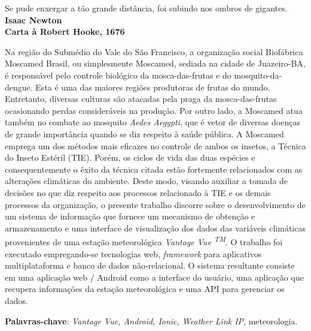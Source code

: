 \begin{epigrafe}
    \vspace*{\fill}
	\begin{flushright}
		Se pude enxergar a tão grande distância, foi subindo nos ombros de gigantes.\\
		 \vspace{\baselineskip}
		\textbf{Isaac Newton}\\
		\textbf{Carta à Robert Hooke, 1676}
	\end{flushright}
\end{epigrafe}


\setlength{\absparsep}{18pt} %
\begin{resumo}
Na região do Submédio do Vale do São Francisco, a organização social Biofábrica Moscamed Brasil, ou simplesmente Moscamed, sediada na cidade de Juazeiro-BA, é responsável pelo controle biológico da mosca-das-frutas e do mosquito-da-dengue. Esta é uma das maiores regiões produtoras de frutas do mundo. Entretanto, diversas culturas são atacadas pela praga da mosca-das-frutas ocasionando perdas consideráveis na produção. Por outro lado, a Moscamed atua também no combate ao mosquito \textit{Aedes Aegypti}, que é vetor de diversas doenças de grande importância quando se diz respeito à saúde pública. A Moscamed emprega um dos métodos mais eficazes no controle de ambos os insetos, a Técnica do Inseto Estéril (TIE). Porém, os ciclos de vida das duas espécies e consequentemente o êxito da técnica citada estão fortemente relacionados com as alterações climáticas do ambiente. Deste modo, visando auxiliar a tomada de decisões no que diz respeito aos processos relacionado à TIE e os demais processos da organização, o presente trabalho discorre sobre o desenvolvimento de um sistema de informação que fornece um mecanismo de obtenção e armazenamento e uma interface de visualização dos dados das variáveis climáticas provenientes de uma estação meteorológica \textit{Vantage Vue \textsuperscript{TM}}. O trabalho foi executado empregando-se tecnologias web, \textit{framework} para aplicativos multiplataforma e banco de dados não-relacional. O sistema resultante consiste em uma aplicação web / Android como a interface do usuário, uma aplicação que recupera informações da estação meteorológica e uma API para gerenciar os dados.

 \textbf{Palavras-chave}: \textit{Vantage Vue, Android, Ionic, Weather Link IP}, meteorologia.

\end{resumo}

